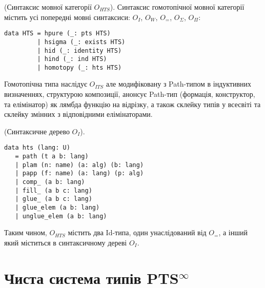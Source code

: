 \begin{definition} (Синтаксис мовної категорії $O_{HTS}$).
Синтаксис гомотопічної мовної категорії містить усі
попередні мовні синтаксиси: $O_I$, $O_W$, $O_=$, $O_\Sigma$, $O_\Pi$:
\begin{lstlisting}
data HTS = hpure (_: pts HTS)
         | hsigma (_: exists HTS)
         | hid (_: identity HTS)
         | hind (_: ind HTS)
         | homotopy (_: hts HTS)
\end{lstlisting}
\end{definition}

Гомотопічна типа наслідує $O_{ITS}$ але модифіковану з
Path-типом в індуктивних визначеннях, структурою композиції,
анонсує Path-тип (формація, конструктор, та елімінатор)
як лямбда функцію на відрізку, а також склейку типів у всесвіті
та склейку змінних з відповідними елімінаторами.

\begin{definition} (Синтаксичне дерево $O_I$).
\begin{lstlisting}
data hts (lang: U)
   = path (t a b: lang)
   | plam (n: name) (a: alg) (b: lang)
   | papp (f: name) (a: lang) (p: alg)
   | comp_ (a b: lang)
   | fill_ (a b c: lang)
   | glue_ (a b c: lang)
   | glue_elem (a b: lang)
   | unglue_elem (a b: lang)
\end{lstlisting}
\end{definition}

Таким чином,
$O_{HTS}$ містить два Id-типа, один унаслідований від $O_=$,
а інший який міститься в синтаксичному дереві $O_I$.

\section{Чиста система типів PTS$^\infty$}

